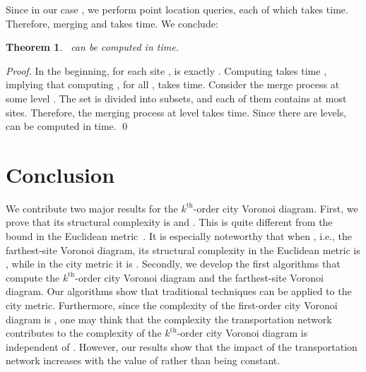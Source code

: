 \documentclass[11pt]{llncs}
\newtheorem{Theorem}{Theorem}
\newcommand{\kth}{\ensuremath{k^{\mathrm{th}}}\xspace}
\newcommand{\kthorder}{\kth-order\xspace}
\begin{document}
Since in our case
,
we perform  point location queries,
each of which takes  time.
Therefore,
merging  and 
takes  time.
We conclude:

\newcommand{\thmfarthesttimetext}{ can be computed in  time.
}

\begin{Theorem}~\label{thm-farthest-time}
\thmfarthesttimetext
\end{Theorem}

\begin{proof}
In the beginning, for each site ,
 is exactly .
Computing  takes  time \cite{BKC-09},
implying that computing , for all , takes  time.
Consider the merge process at some level .
The set  is divided into  subsets,
and each of them contains at most  sites.
Therefore, the merging process at level 
takes  time.
Since there are  levels,
 can be computed in  time.
\qed
\end{proof}



\section{Conclusion}
\label{sec-conclusion}

We contribute two major results for the \kthorder city Voronoi diagram.
First, we prove that its structural complexity is  and .
This is quite different from the  bound in the Euclidean metric~\cite{Lee-82}.
It is especially noteworthy that when , i.e., the farthest-site Voronoi diagram,
its structural complexity in the Euclidean metric is ,
while in the city metric it is .
Secondly, we develop the first algorithms that compute the \kthorder city Voronoi diagram
and the farthest-site Voronoi diagram.
Our algorithms show that traditional techniques can be applied to the city metric.
Furthermore,
since the complexity of the first-order city Voronoi diagram is ,
one may think that the complexity the transportation network contributes to the complexity of the \kthorder city Voronoi diagram is independent of .
However, our results show that the impact of the transportation network increases with the value of 
rather than being constant.
\end{document}
